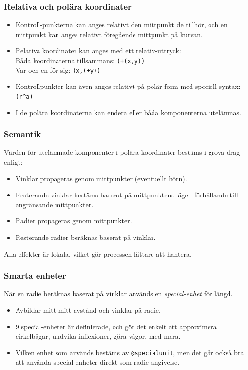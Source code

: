 \documentclass[noamsthm,handout]{beamer}
\begin{document}
\begin{frame}\frametitle{Relativa och polära koordinater}
  \begin{itemize}
  \item Kontroll-punkterna kan anges relativt den mittpunkt de tillhör, och en mittpunkt kan anges relativt föregående mittpunkt på kurvan.
  \item Relativa koordinater kan anges med ett relativ-uttryck:\\
    Båda koordinaterna tillsammans: \texttt{{\color{red}(+}(x,y){\color{red})}}\\
    Var och en för sig: \texttt{(x,{\color{red}(+}y{\color{red})})}
  \item Kontrollpunkter kan även anges relativt på polär form med speciell syntax:\\
    \texttt{{\color{red}(}r{\color{red}\textasciicircum}a{\color{red})}}
  \item I de polära koordinaterna kan endera eller båda komponenterna utelämnas.
  \end{itemize}
\end{frame}
\begin{frame}\frametitle{Semantik}
  Värden för utelämnade komponenter i polära koordinater bestäms i grova drag enligt:
  \begin{itemize}
  \item Vinklar propageras genom mittpunkter (eventuellt hörn).
  \item Resterande vinklar bestäms baserat på mittpunktens läge i förhållande till angränsande mittpunkter.
  \item Radier propageras genom mittpunkter.
  \item Resterande radier beräknas baserat på vinklar.
  \end{itemize}

  Alla effekter är lokala, vilket gör processen lättare att hantera.
\end{frame}
\begin{frame}\frametitle{Smarta enheter}
  När en radie beräknas baserat på vinklar används en \emph{special-enhet} för längd.
  \begin{itemize}
  \item Avbildar mitt-mitt-avstånd och vinklar på radie.
  \item $9$ special-enheter är definierade, och gör det enkelt att approximera cirkelbågar, undvika inflexioner, göra vågor, med mera.
  \item Vilken enhet som används bestäms av \texttt{@specialunit}, men det går också bra att använda special-enheter direkt som radie-angivelse.
  \end{itemize}
\end{frame}
\end{document}

